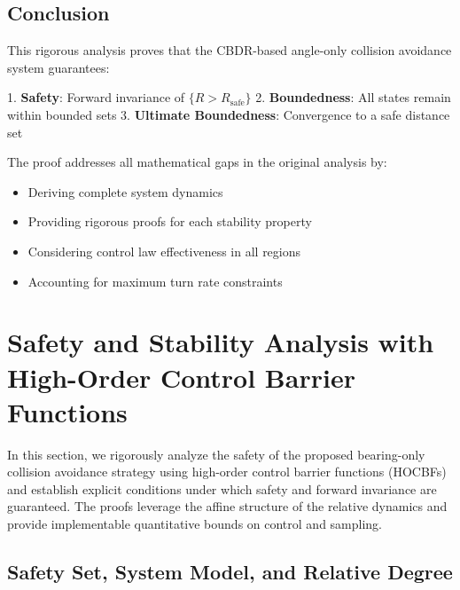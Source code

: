 \documentclass[11pt,a4paper]{article}
\numberwithin{equation}{section}
\begin{document}
\subsection{Conclusion}

This rigorous analysis proves that the CBDR-based angle-only collision avoidance system guarantees:

1. \textbf{Safety}: Forward invariance of $\{R > R_{\text{safe}}\}$
2. \textbf{Boundedness}: All states remain within bounded sets
3. \textbf{Ultimate Boundedness}: Convergence to a safe distance set

The proof addresses all mathematical gaps in the original analysis by:
\begin{itemize}
\item Deriving complete system dynamics
\item Providing rigorous proofs for each stability property
\item Considering control law effectiveness in all regions
\item Accounting for maximum turn rate constraints
\end{itemize}

\newpage
\section{Safety and Stability Analysis with High-Order Control Barrier Functions}
\label{sec:safety}

In this section, we rigorously analyze the safety of the proposed bearing-only collision avoidance strategy using high-order control barrier functions (HOCBFs) and establish explicit conditions under which safety and forward invariance are guaranteed. The proofs leverage the affine structure of the relative dynamics and provide implementable quantitative bounds on control and sampling.

\subsection{Safety Set, System Model, and Relative Degree}
\label{sec:cbf_setup}
\end{document}
